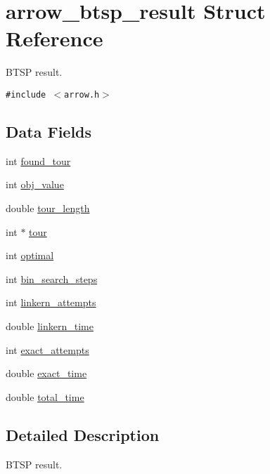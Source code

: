 \hypertarget{structarrow__btsp__result}{
\section{arrow\_\-btsp\_\-result Struct Reference}
\label{structarrow__btsp__result}
}
BTSP result.  


{\tt \#include $<$arrow.h$>$}

\subsection*{Data Fields}
\begin{CompactItemize}
\item 
int \hyperlink{structarrow__btsp__result_6ba21b4231cfe2c1e437a9f7e8f31aa6}{found\_\-tour}
\item 
int \hyperlink{structarrow__btsp__result_ea5f7f45bf61f33ca6b57829da92e041}{obj\_\-value}
\item 
double \hyperlink{structarrow__btsp__result_3c0b8827a873df71166e7fe9419c45c2}{tour\_\-length}
\item 
int $\ast$ \hyperlink{structarrow__btsp__result_ebd9a553dc3bf31f52eda0b293b0e272}{tour}
\item 
int \hyperlink{structarrow__btsp__result_febcf61e24bf277eeb7795c18bd42b8b}{optimal}
\item 
int \hyperlink{structarrow__btsp__result_80106c5f0b8f82353ad6771ad9eaac71}{bin\_\-search\_\-steps}
\item 
int \hyperlink{structarrow__btsp__result_53b6e6b7922eb5c3e5a1b135d42d5654}{linkern\_\-attempts}
\item 
double \hyperlink{structarrow__btsp__result_7e8a3ff6f55c89caa52a7a793fa36dd6}{linkern\_\-time}
\item 
int \hyperlink{structarrow__btsp__result_47433b850b6addae44522177a50696b3}{exact\_\-attempts}
\item 
double \hyperlink{structarrow__btsp__result_edefe82c06445f657e5147d52720bdef}{exact\_\-time}
\item 
double \hyperlink{structarrow__btsp__result_dea5711f0a574d98f66d1b20011a68de}{total\_\-time}
\end{CompactItemize}


\subsection{Detailed Description}
BTSP result. 

